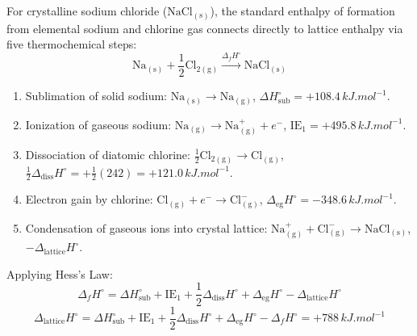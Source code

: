 \documentclass[10pt,a4paper]{article}
\begin{document}
\begin{usecasebox}
For crystalline sodium chloride ($\mathrm{NaCl_{(s)}}$), the standard enthalpy of formation from elemental sodium and chlorine gas connects directly to lattice enthalpy via five thermochemical steps:
\begin{equation}
  \mathrm{Na_{(s)}} + \frac{1}{2}\mathrm{Cl_{2(g)}} \xrightarrow{\Delta_f H^\circ} \mathrm{NaCl_{(s)}}
\end{equation}
\begin{enumerate}
  \item Sublimation of solid sodium: $\mathrm{Na_{(s)}} \to \mathrm{Na_{(g)}}$, $\Delta H_{\text{sub}}^\circ = +108.4\,\si{kJ.mol^{-1}}$.
  \item Ionization of gaseous sodium: $\mathrm{Na_{(g)}} \to \mathrm{Na^+_{(g)}} + e^-$, $\text{IE}_1 = +495.8\,\si{kJ.mol^{-1}}$.
  \item Dissociation of diatomic chlorine: $\frac{1}{2}\mathrm{Cl_{2(g)}} \to \mathrm{Cl_{(g)}}$, $\frac{1}{2}\Delta_{\text{diss}} H^\circ = +\frac{1}{2}(242) = +121.0\,\si{kJ.mol^{-1}}$.
  \item Electron gain by chlorine: $\mathrm{Cl_{(g)}} + e^- \to \mathrm{Cl^-_{(g)}}$, $\Delta_{\text{eg}} H^\circ = -348.6\,\si{kJ.mol^{-1}}$.
  \item Condensation of gaseous ions into crystal lattice: $\mathrm{Na^+_{(g)}} + \mathrm{Cl^-_{(g)}} \to \mathrm{NaCl_{(s)}}$, $-\Delta_{\text{lattice}} H^\circ$.
\end{enumerate}
Applying Hess's Law:
\begin{equation}
  \Delta_f H^\circ = \Delta H_{\text{sub}}^\circ + \text{IE}_1 + \frac{1}{2}\Delta_{\text{diss}} H^\circ + \Delta_{\text{eg}} H^\circ - \Delta_{\text{lattice}} H^\circ
\end{equation}
\begin{equation}
  \Delta_{\text{lattice}} H^\circ = \Delta H_{\text{sub}}^\circ + \text{IE}_1 + \frac{1}{2}\Delta_{\text{diss}} H^\circ + \Delta_{\text{eg}} H^\circ - \Delta_f H^\circ = +788\,\si{kJ.mol^{-1}}
\end{equation}
\end{usecasebox}
\end{document}
